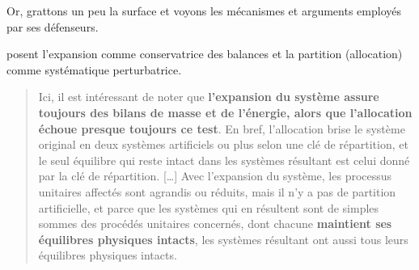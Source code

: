 {%
}
Or, grattons un peu la surface et voyons les mécanismes et arguments employés par ses défenseurs.

\citeauthor{weidema_avoiding_2010} posent l'expansion comme conservatrice des balances et la partition (allocation) comme systématique perturbatrice.
\blockcquote[traduction]{weidema_avoiding_2010}{
Ici, il est intéressant de noter que \textbf{l'expansion du système assure toujours des bilans de masse et de l'énergie, alors que l'allocation échoue presque toujours ce test}.
En bref, l'allocation brise le système original en deux systèmes artificiels ou plus selon une clé de répartition, et le seul équilibre qui reste intact dans les systèmes résultant est celui donné par la clé de répartition.
[\dots]
Avec l'expansion du système, les processus unitaires affectés sont agrandis ou réduits, mais il n'y a pas de partition artificielle, et parce que les systèmes qui en résultent sont de simples sommes des procédés unitaires concernés, dont chacune \textbf{maintient ses équilibres physiques intacts}, les systèmes résultant ont aussi tous leurs équilibres physiques intacts.
}

